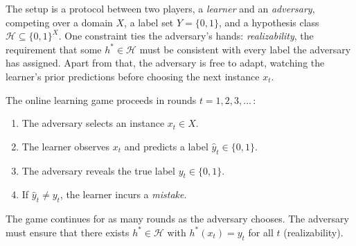 The setup is a protocol between two players, a \emph{learner} and an \emph{adversary}, competing over a domain $X$, a label set $Y = \{0,1\}$, and a hypothesis class $\mathcal{H} \subseteq \{0,1\}^X$. One constraint ties the adversary's hands: \emph{realizability}, the requirement that some $h^* \in \mathcal{H}$ must be consistent with every label the adversary has assigned. Apart from that, the adversary is free to adapt, watching the learner's prior predictions before choosing the next instance $x_t$.

\begin{defn}
\label{def:online-protocol}
The online learning game proceeds in rounds $t = 1, 2, 3, \ldots$\,:
\begin{enumerate}[leftmargin=*, itemsep=2pt]
\item The adversary selects an instance $x_t \in X$.
\item The learner observes $x_t$ and predicts a label $\hat{y}_t \in \{0,1\}$.
\item The adversary reveals the true label $y_t \in \{0,1\}$.
\item If $\hat{y}_t \neq y_t$, the learner incurs a \emph{mistake}.
\end{enumerate}
The game continues for as many rounds as the adversary chooses. The adversary must ensure that there exists $h^* \in \mathcal{H}$ with $h^*(x_t) = y_t$ for all $t$ (realizability).
\end{defn}

